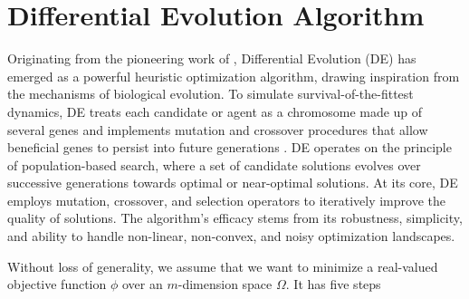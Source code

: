 \documentclass [PhD] {package/uclathes}
\begin{document}
\section{Differential Evolution Algorithm}

Originating from the pioneering work of \textcite{storn1997differential}, Differential Evolution (DE) has emerged as a powerful heuristic optimization algorithm, drawing inspiration from the mechanisms of biological evolution.  To simulate survival-of-the-fittest dynamics, DE treats each candidate or agent as a chromosome made up of several genes and implements mutation and crossover procedures that allow beneficial genes to persist into future generations \parencite{storn1997differential}. DE operates on the principle of population-based search, where a set of candidate solutions evolves over successive generations towards optimal or near-optimal solutions. At its core, DE employs mutation, crossover, and selection operators to iteratively improve the quality of solutions. The algorithm's efficacy stems from its robustness, simplicity, and ability to handle non-linear, non-convex, and noisy optimization landscapes.


Without loss of generality, we assume that we want to minimize a real-valued objective function $\phi$ over an $m$-dimension space $\Omega$. It has five steps
\end{document}

